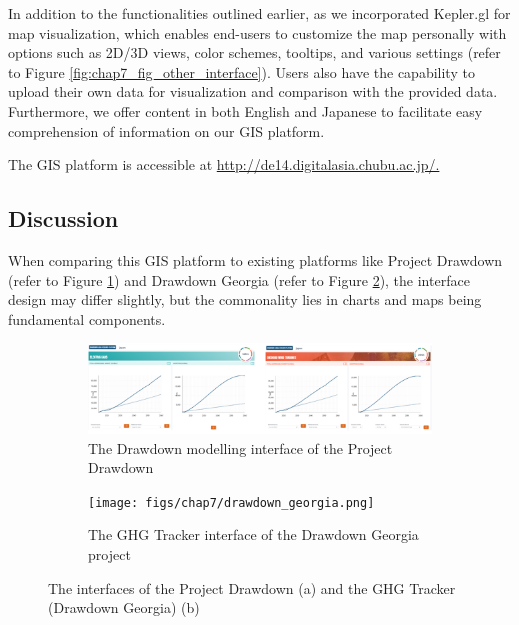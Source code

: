 In addition to the functionalities outlined earlier, as we incorporated Kepler.gl for map visualization, which enables end-users to customize the map personally with options such as 2D/3D views, color schemes, tooltips, and various settings (refer to Figure \ref{fig:chap7_fig_other_interface}). Users also have the capability to upload their own data for visualization and comparison with the provided data. Furthermore, we offer content in both English and Japanese to facilitate easy comprehension of information on our GIS platform. \par

The GIS platform is accessible at \url{http://de14.digitalasia.chubu.ac.jp/.}\par


\subsection{Discussion}

When comparing this GIS platform to existing platforms like Project Drawdown (refer to Figure \ref{fig:chap7_fig_other_gis_a}) and Drawdown Georgia \citep{brown2022carbon, brown2021translating} (refer to Figure \ref{fig:chap7_fig_other_gis_b}), the interface design may differ slightly, but the commonality lies in charts and maps being fundamental components.\par

\begin{figure}[tbh!]
  \centering
  \begin{subfigure}{\textwidth}
      \centering
      \includegraphics[width=.9\textwidth]{figs/chap7/project_drawdown.png}
      \caption{The Drawdown modelling interface of the Project Drawdown}
      \label{fig:chap7_fig_other_gis_a}
  \end{subfigure}

  \begin{subfigure}{\textwidth}
      \centering
      \texttt{[image: figs/chap7/drawdown\_georgia.png]}
      \caption{The GHG Tracker interface of the Drawdown Georgia project}
      \label{fig:chap7_fig_other_gis_b}
  \end{subfigure}
  \caption[Comparison with other platforms]{The interfaces of the Project Drawdown (a) and the GHG Tracker (Drawdown Georgia) (b)}
  \label{fig:chap7_fig_other_gis}
\end{figure}

